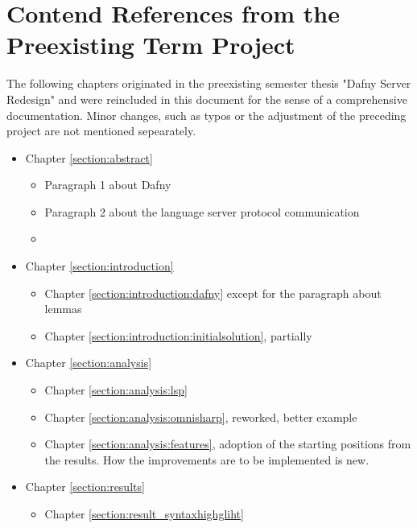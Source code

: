 \section*{Contend References from the Preexisting Term Project}
The following chapters originated in the preexisting semester thesis "Dafny Server Redesign"\cite{sa} and were reincluded in this document for the sense of a comprehensive documentation. Minor changes, such as typos or the adjustment of the preceding project are not mentioned sepearately.
\begin{itemize}
    \item Chapter \ref{section:abstract} 
        \begin{itemize}
            \item Paragraph 1 about Dafny
            \item Paragraph 2 about the language server protocol communication
            \item  {}
        \end{itemize}
    \item Chapter \ref{section:introduction} 
        \begin{itemize}
            \item Chapter \ref{section:introduction:dafny} except for the paragraph about lemmas
            \item Chapter \ref{section:introduction:initialsolution}, partially
        \end{itemize}

    \item Chapter \ref{section:analysis} 
        \begin{itemize}
            \item Chapter \ref{section:analysis:lsp}
            \item Chapter \ref{section:analysis:omnisharp}, reworked, better example
            \item Chapter \ref{section:analysis:features}, adoption of the starting positions from the results. How the improvements are to be implemented is new.
        \end{itemize}

    \item Chapter \ref{section:results} 
        \begin{itemize}
            \item Chapter \ref{section:result_syntaxhighgliht}
        \end{itemize}

\end{itemize}
